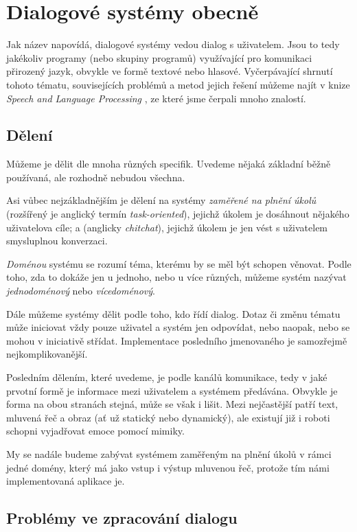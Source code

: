 
\chapter{Dialogové systémy obecně}

Jak název napovídá, dialogové systémy vedou dialog s uživatelem. Jsou to
tedy jakékoliv programy (nebo skupiny programů) využívající
pro komunikaci přirozený jazyk, obvykle ve formě textové nebo hlasové.
Vyčerpávající shrnutí tohoto tématu, souvisejících problémů a metod
jejich řešení můžeme najít v knize \textit{Speech and Language Processing}
\citep{jurafsky_slp_2020}, ze které jsme čerpali mnoho znalostí.

\section{Dělení}
Můžeme je dělit dle mnoha různých specifik. Uvedeme nějaká
základní běžně používaná, ale rozhodně nebudou všechna.

Asi vůbec
nejzákladnějším je dělení na systémy \textit{zaměřené na plnění úkolů}
(rozšířený je anglický termín \textit{task-oriented}), jejichž úkolem
je dosáhnout nějakého uživatelova cíle; a  (anglicky
\textit{chitchat}), jejichž úkolem je jen vést s uživatelem smysluplnou
konverzaci.

\textit{Doménou} systému se rozumí téma, kterému by se měl být schopen
věnovat. Podle toho, zda to dokáže jen u jednoho, nebo u více různých,
můžeme systém nazývat \textit{jednodoménový} nebo \textit{vícedoménový}.

Dále můžeme systémy dělit podle toho, kdo řídí dialog. Dotaz či změnu tématu
může iniciovat vždy pouze uživatel a systém jen odpovídat, nebo naopak, nebo
se mohou v iniciativě střídat. Implementace posledního jmenovaného je samozřejmě
nejkomplikovanější.

Posledním dělením, které uvedeme, je podle kanálů komunikace, tedy
v jaké prvotní formě je informace mezi uživatelem a systémem předávána.
Obvykle je forma na obou stranách stejná, může se však i lišit. Mezi
nejčastější patří text, mluvená řeč a obraz (ať už statický nebo
dynamický), ale existují již i roboti schopni vyjadřovat emoce pomocí
mimiky.

My se nadále budeme zabývat systémem zaměřeným na plnění úkolů v rámci jedné
domény, který má jako vstup i výstup mluvenou řeč, protože tím námi
implementovaná aplikace je.

\section{Problémy ve zpracování dialogu}

